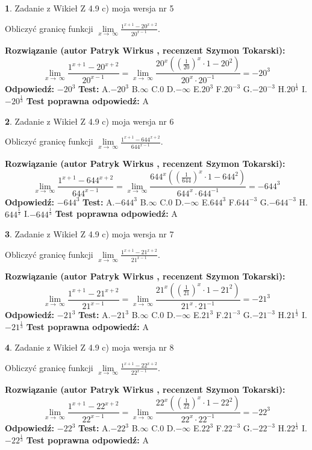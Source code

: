 \documentclass[12pt, a4paper]{article}
\theoremstyle{definition} %
\newtheorem{zad}{}
\newcommand{\zadStart}[1]{\begin{zad}#1\newline}
\newcommand{\zadStop}{\end{zad}}
\newcommand{\rozwStart}[2]{\noindent \textbf{Rozwiązanie (autor #1 , recenzent #2): }\newline}
\newcommand{\rozwStop}{\newline}
\newcommand{\odpStart}{\noindent \textbf{Odpowiedź:}\newline}
\newcommand{\odpStop}{\newline}
\newcommand{\testStart}{\noindent \textbf{Test:}\newline}
\newcommand{\testStop}{\newline}
\newcommand{\kluczStart}{\noindent \textbf{Test poprawna odpowiedź:}\newline}
\newcommand{\kluczStop}{\newline}
\begin{document}
\zadStart{Zadanie z Wikieł Z 4.9 c) moja wersja nr 5}


Obliczyć granicę funkcji  $\lim\limits_{x\to\ \infty}\frac{1^{x+1}-20^{x+2}}{20^{x-1}}$.
\zadStop
\rozwStart{Patryk Wirkus}{Szymon Tokarski}
$$\lim\limits_{x\to\ \infty}\frac{1^{x+1}-20^{x+2}}{20^{x-1}}=\lim\limits_{x\to\ \infty}\frac{20^{x}((\frac{1}{20})^{x}\cdot 1 -20^{2})}{20^{x}\cdot 20^{-1}} = -20^{3}$$
\rozwStop
\odpStart
$-20^{3}$
\odpStop
\testStart
A.$-20^{3}$ B.$\infty$ C.$0$ D.$-\infty$ E.$20^{3}$
F.$20^{-3}$ G.$-20^{-3}$
H.$20^{\frac{1}{3}}$
I.$-20^{\frac{1}{3}}$
\testStop
\kluczStart
A
\kluczStop



\zadStart{Zadanie z Wikieł Z 4.9 c) moja wersja nr 6}


Obliczyć granicę funkcji  $\lim\limits_{x\to\ \infty}\frac{1^{x+1}-644^{x+2}}{644^{x-1}}$.
\zadStop
\rozwStart{Patryk Wirkus}{Szymon Tokarski}
$$\lim\limits_{x\to\ \infty}\frac{1^{x+1}-644^{x+2}}{644^{x-1}}=\lim\limits_{x\to\ \infty}\frac{644^{x}((\frac{1}{644})^{x}\cdot 1 -644^{2})}{644^{x}\cdot 644^{-1}} = -644^{3}$$
\rozwStop
\odpStart
$-644^{3}$
\odpStop
\testStart
A.$-644^{3}$ B.$\infty$ C.$0$ D.$-\infty$ E.$644^{3}$
F.$644^{-3}$ G.$-644^{-3}$
H.$644^{\frac{1}{3}}$
I.$-644^{\frac{1}{3}}$
\testStop
\kluczStart
A
\kluczStop



\zadStart{Zadanie z Wikieł Z 4.9 c) moja wersja nr 7}


Obliczyć granicę funkcji  $\lim\limits_{x\to\ \infty}\frac{1^{x+1}-21^{x+2}}{21^{x-1}}$.
\zadStop
\rozwStart{Patryk Wirkus}{Szymon Tokarski}
$$\lim\limits_{x\to\ \infty}\frac{1^{x+1}-21^{x+2}}{21^{x-1}}=\lim\limits_{x\to\ \infty}\frac{21^{x}((\frac{1}{21})^{x}\cdot 1 -21^{2})}{21^{x}\cdot 21^{-1}} = -21^{3}$$
\rozwStop
\odpStart
$-21^{3}$
\odpStop
\testStart
A.$-21^{3}$ B.$\infty$ C.$0$ D.$-\infty$ E.$21^{3}$
F.$21^{-3}$ G.$-21^{-3}$
H.$21^{\frac{1}{3}}$
I.$-21^{\frac{1}{3}}$
\testStop
\kluczStart
A
\kluczStop



\zadStart{Zadanie z Wikieł Z 4.9 c) moja wersja nr 8}


Obliczyć granicę funkcji  $\lim\limits_{x\to\ \infty}\frac{1^{x+1}-22^{x+2}}{22^{x-1}}$.
\zadStop
\rozwStart{Patryk Wirkus}{Szymon Tokarski}
$$\lim\limits_{x\to\ \infty}\frac{1^{x+1}-22^{x+2}}{22^{x-1}}=\lim\limits_{x\to\ \infty}\frac{22^{x}((\frac{1}{22})^{x}\cdot 1 -22^{2})}{22^{x}\cdot 22^{-1}} = -22^{3}$$
\rozwStop
\odpStart
$-22^{3}$
\odpStop
\testStart
A.$-22^{3}$ B.$\infty$ C.$0$ D.$-\infty$ E.$22^{3}$
F.$22^{-3}$ G.$-22^{-3}$
H.$22^{\frac{1}{3}}$
I.$-22^{\frac{1}{3}}$
\testStop
\kluczStart
A
\kluczStop
\end{document}
